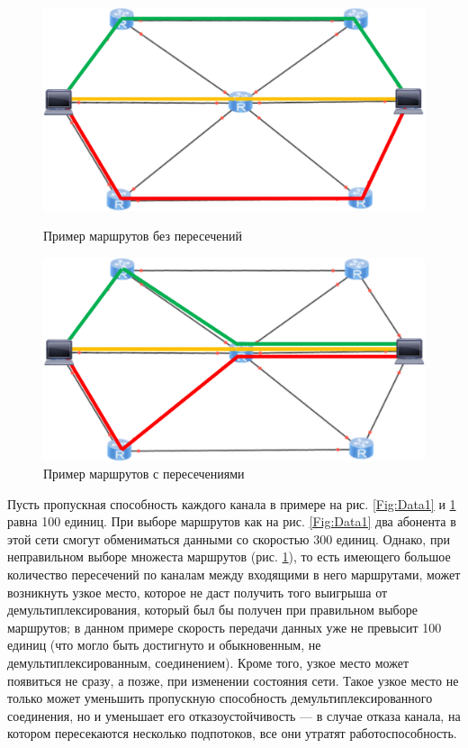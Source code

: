 \documentclass[a4paper]{article}
\begin{document}
\begin{figure}[H]
   \begin{minipage}{0.5\textwidth}
     \centering
     \includegraphics[width=.7\linewidth]{wrout.png}
     \caption{Пример маршрутов без пересечений}\label{Fig:Data1}
   \end{minipage}
   \begin{minipage}{0.5\textwidth}
     \centering
     \includegraphics[width=.7\linewidth]{woutrout.png}
     \caption{Пример маршрутов с пересечениями}\label{Fig:Data2}
   \end{minipage}\hfill
\end{figure}

Пусть пропускная способность каждого канала в примере на рис. \ref{Fig:Data1} и \ref{Fig:Data2} равна 100 единиц. При выборе маршрутов как на рис. \ref{Fig:Data1} два абонента в этой сети смогут обмениматься данными со скоростью 300 единиц. Однако, при неправильном выборе множеста маршрутов (рис. \ref{Fig:Data2}), то есть имеющего большое количество пересечений по каналам между входящими в него маршрутами, может возникнуть узкое место, которое не даст получить того выигрыша от демультиплексирования, который был бы получен при правильном выборе маршрутов; в данном примере скорость передачи данных уже не превысит 100 единиц (что могло быть достигнуто и обыкновенным, не демультиплексированным, соединением). Кроме того, узкое место может появиться не сразу, а позже, при изменении состояния сети. Такое узкое место не только может уменьшить пропускную способность демультиплексированного соединения, но и уменьшает его отказоустойчивость --- в случае отказа канала, на котором пересекаются несколько подпотоков, все они утратят работоспособность.
\end{document}
